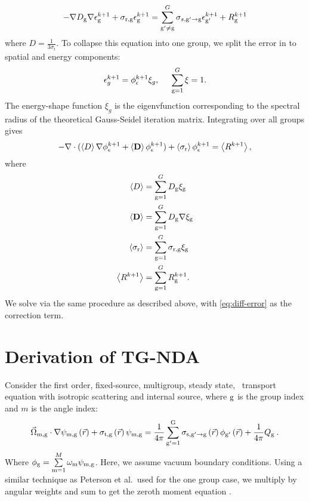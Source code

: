   \begin{equation}
      -\nabla D_{\mathrm{g}} \nabla \epsilon_{\mathrm{g}}^{k+1} + \sigma_{\mathrm{r}, \mathrm{g}} \epsilon_{\mathrm{g}}^{k+1} = \sum\limits_{\mathrm{g}' \neq \mathrm{g}}^G \sigma_{s, \mathrm{g}' \rightarrow \mathrm{g}}\epsilon_{\mathrm{g}'}^{k+1} + R_{\mathrm{g}}^{k+1}
  \end{equation}
  where $D = \frac{1}{3\sigma_t}$. To collapse this equation into one group, we split the error in to spatial and energy components:
  \begin{equation}
      \epsilon_g^{k+1} = \phi_\epsilon^{k+1}\xi_g, \hspace{5mm} \sum_{\mathrm{g}=1}^G \xi = 1. 
  \end{equation}
  The energy-shape function $\xi_g$ is the eigenvfunction corresponding to the spectral radius of the theoretical Gauss-Seidel iteration matrix. Integrating over all groups gives 
  \begin{equation}
       -\nabla \cdot ( \left<D \right > \nabla \phi_\epsilon^{k+1} + \left< \textbf{D} \right> \phi_\epsilon^{k+1}) + \left < \sigma_{\mathrm{r}} \right> \phi_\epsilon^{k+1} = \left < R^{k+1} \right> , 
       \label{eq:diff-error}
  \end{equation}
 where
 \begin{align*}
     \left< D \right > &= \sum\limits_{\mathrm{g}=1}^G D_{\mathrm{g}} \xi_{\mathrm{g}} \\
     \left< \textbf{D} \right > &= \sum\limits_{\mathrm{g}=1}^G D_{\mathrm{g}} \nabla \xi_{\mathrm{g}} \\
     \left< \sigma_{\mathrm{r}} \right > &= \sum\limits_{\mathrm{g}=1}^G \sigma_{\mathrm{r}, \mathrm{g}} \xi_{\mathrm{g}} \\
     \left< R^{k+1} \right > &= \sum\limits_{\mathrm{g}=1}^G R_{\mathrm{g}}^{k+1}.
 \end{align*}
 We solve via the same procedure as described above, with \ref{eq:diff-error} as the correction term. 
\section{Derivation of TG-NDA}
Consider the first order, fixed-source, multigroup, steady state, \sn\ transport equation with isotropic scattering and internal source, where $\mathrm{g}$ is the group index and $m$ is the angle index:
  \begin{equation}
  \vec{\Omega}_{\mathrm{m},\mathrm{g}}\cdot \nabla \psi_{\mathrm{m},\mathrm{g}} \left(\vec{r}\right)+ \sigma_{\mathrm{t},\mathrm{g}}\left(\vec{r}\right)\psi_{\mathrm{m},\mathrm{g}} = \frac{1}{4 \pi} \sum\limits_{\mathrm{g}'=1}^{\mathrm{G}} \sigma_{\mathrm{s},{\mathrm{g}'}\to\mathrm{g}}\left(\vec{r}\right) \phi_{\mathrm{g}'}\left(\vec{r}\right) + \frac{1}{4 \pi} Q_{\mathrm{g}}\:.
  \end{equation}
  Where $\phi_{\mathrm{g}} = \sum\limits_{\mathrm{m}=1}^M \omega_{\mathrm{m}} \psi_{\mathrm{m}, \mathrm{g}}$. Here, we assume vacuum boundary conditions. Using a similar technique as Peterson et al.\ used for the one group case, we multiply by angular weights and sum to get the zeroth moment equation \cite{morel-holo}.

